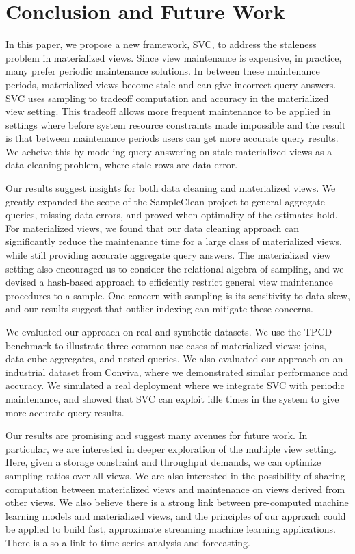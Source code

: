 \vspace{-1em}
\section{Conclusion and Future Work}\label{conclusion}
\vspace{-.3em}
In this paper, we propose a new framework, SVC, to address the staleness problem in materialized views.
Since view maintenance is expensive, in practice, many prefer periodic maintenance solutions.
In between these maintenance periods, materialized views become stale and can give incorrect query answers.
SVC uses sampling to tradeoff computation and accuracy in the materialized view setting.
This tradeoff allows more frequent maintenance to be applied in settings where before system resource constraints made impossible and the result is that between maintenance periods users can get more accurate query results.
We acheive this by modeling query answering on stale materialized views as a data cleaning problem, where stale rows are data error.

Our results suggest insights for both data cleaning and materialized views.
We greatly expanded the scope of the SampleClean project \cite{wang1999sample} to general aggregate queries, missing data errors, and proved when optimality of the estimates hold.
For materialized views, we found that our data cleaning approach can significantly reduce the maintenance time for a large class of materialized views, while still providing accurate aggregate query answers.
The materialized view setting also encouraged us to consider the relational algebra of sampling, and we devised a hash-based approach to efficiently restrict general view maintenance procedures to a sample.
One concern with sampling is its sensitivity to data skew, and our results suggest that outlier indexing can mitigate these concerns.

We evaluated our approach on real and synthetic datasets.
We use the TPCD benchmark to illustrate three common use cases of materialized views: joins, data-cube aggregates, and nested queries.
We also evaluated our approach on an industrial dataset from Conviva, where we demonstrated similar performance and accuracy.
We simulated a real deployment where we integrate SVC with periodic maintenance, and showed that SVC can exploit idle times in the system to give more accurate query results.

Our results are promising and suggest many avenues for future work.
In particular, we are interested in deeper exploration of the multiple view setting.
Here, given a storage constraint and throughput demands, we can optimize sampling ratios over all views.
We are also interested in the possibility of sharing computation between materialized views and maintenance on views derived from other views.
We also believe there is a strong link between pre-computed machine learning models and materialized views, and the principles of our approach could be applied to build fast, approximate streaming machine learning applications.
There is also a link to time series analysis and forecasting.





